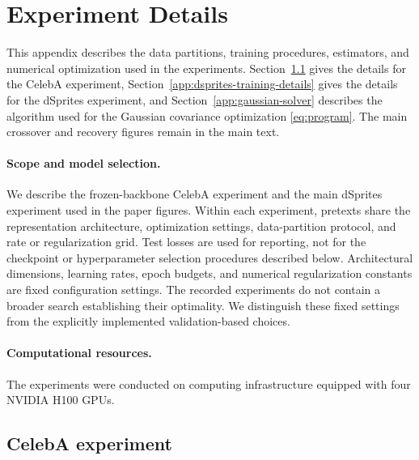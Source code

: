 \providecommand{\appendixfigdir}{paper_plotting/paper_figures/appendix}

\section{Experiment Details}
\label{app:experiment-details}

This appendix describes the data partitions, training procedures, estimators,
and numerical optimization used in the experiments. Section~\ref{app:celeba-training-details} gives the details for the CelebA experiment, Section~\ref{app:dsprites-training-details} gives the details for the dSprites experiment, and Section~\ref{app:gaussian-solver} describes the algorithm used for the Gaussian covariance optimization \eqref{eq:program}. The main crossover and recovery figures remain in the main text.

\paragraph{Scope and model selection.}
We describe the frozen-backbone CelebA experiment and the main dSprites
experiment used in the paper figures. Within each experiment, pretexts share
the representation architecture, optimization settings, data-partition
protocol, and rate or regularization grid. Test losses are used for reporting,
not for the checkpoint or hyperparameter selection procedures described
below. Architectural dimensions, learning rates, epoch budgets, and numerical
regularization constants are fixed configuration settings. The recorded
experiments do not contain a broader search establishing their optimality.
We distinguish these fixed settings from the explicitly implemented
validation-based choices.

\paragraph{Computational resources.}
The experiments were conducted on computing infrastructure equipped with
four NVIDIA H100 GPUs.

\subsection{CelebA experiment}
\label{app:celeba-training-details}

